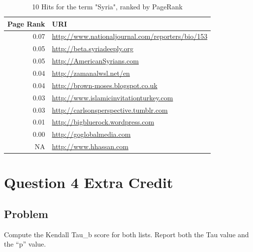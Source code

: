 \documentclass[letterpaper,11pt]{report}
\begin{document}
\begin{savenotes}
\begin{table}
	\centering
    \begin{tabular}{|r|l|}
    \hline
    Page Rank & URI                                   \\ \hline
    0.07& \url{http://www.nationaljournal.com/reporters/bio/153}        \\ \hline		
		0.05& \url{http://beta.syriadeeply.org}           \\ \hline
		0.05& \url{http://AmericanSyrians.com}            \\ \hline
    0.04& \url{http://zamanalwsl.net/en}                 \\ \hline
		0.04& \url{http://brown-moses.blogspot.co.uk}     \\ \hline		
    0.03& \url{http://www.islamicinvitationturkey.com}\\ \hline				
    0.03& \url{http://carlsonsperspective.tumblr.com} \\ \hline
    0.01& \url{http://bigbluerock.wordpress.com}      \\ \hline						
    0.00& \url{http://goglobalmedia.com}              \\ \hline
    NA & \url{http://www.hhassan.com}                 \\ \hline		
    \end{tabular}
    \caption {10 Hits for the term "Syria", ranked by PageRank}
			\label{tab:PageRank}
\end{table}

\section{Question 4 Extra Credit}
\subsection{Problem}Compute the Kendall Tau\_b score for both lists. Report both the Tau value and the ``p'' value.

\end{savenotes}
\end{document}
